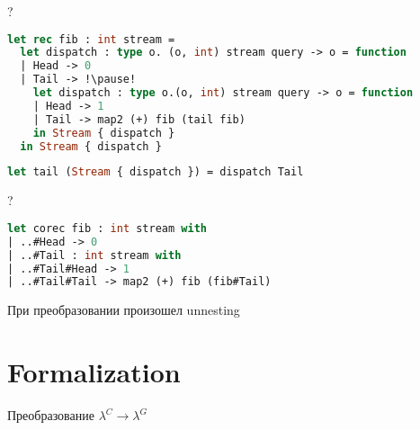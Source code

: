 \documentclass[10pt, mathserif]{beamer}
\theoremstyle{definition}
\begin{document}
\begin{frame}[fragile]{?}
\begin{lstlisting}[language=ocaml]
let rec fib : int stream =
  let dispatch : type o. (o, int) stream query -> o = function
  | Head -> 0
  | Tail -> !\pause!
    let dispatch : type o.(o, int) stream query -> o = function
    | Head -> 1
    | Tail -> map2 (+) fib (tail fib)
    in Stream { dispatch }
  in Stream { dispatch }
\end{lstlisting}
\begin{lstlisting}[language=ocaml]
let tail (Stream { dispatch }) = dispatch Tail
\end{lstlisting}



\end{frame}

\begin{frame}[fragile]{?}
\begin{lstlisting}[language=ocaml]
let corec fib : int stream with
| ..#Head -> 0
| ..#Tail : int stream with
| ..#Tail#Head -> 1
| ..#Tail#Tail -> map2 (+) fib (fib#Tail)
\end{lstlisting}

При преобразовании произошел unnesting
\end{frame}


\section{Formalization}

\begin{frame}[c]{Преобразование}
\centering
{\LARGE $\lambda^C \to \lambda^G$}
\end{frame}
\end{document}
